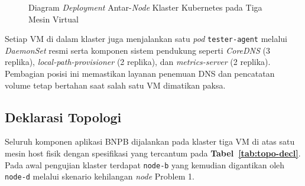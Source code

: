 \begin{figure}[H]
{{%
  }%
  }
  \caption{Diagram \textit{Deployment} Antar-\textit{Node} Klaster Kubernetes pada Tiga Mesin Virtual}
  \label{fig:m2-deploy}
\end{figure}

Setiap VM di dalam klaster juga menjalankan satu \textit{pod} \texttt{tester-agent} melalui \textit{DaemonSet} resmi serta komponen sistem pendukung seperti \textit{CoreDNS} (3 replika), \textit{local-path-provisioner} (2 replika), dan \textit{metrics-server} (2 replika). Pembagian posisi ini memastikan layanan penemuan DNS dan pencatatan volume tetap bertahan saat salah satu VM dimatikan paksa.

\subsection{Deklarasi Topologi}

Seluruh komponen aplikasi BNPB dijalankan pada klaster tiga VM di atas satu mesin host fisik dengan spesifikasi yang tercantum pada \textbf{Tabel~\ref{tab:topo-decl}}. Pada awal pengujian klaster terdapat \texttt{node-b} yang kemudian digantikan oleh \texttt{node-d} melalui skenario kehilangan \textit{node} Problem 1.


